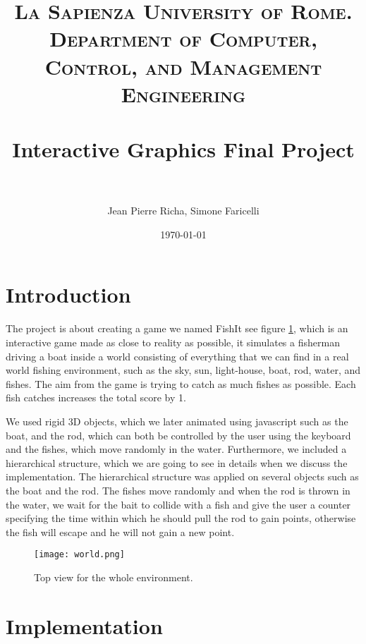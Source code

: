 \documentclass[paper=a4, fontsize=11pt]{scrartcl} %
\title{	
\normalfont \normalsize 
\textsc{La Sapienza University of Rome. Department of Computer, Control, and Management Engineering} \\ [25pt] %
\horrule{0.5pt} \\[0.4cm] %
\huge Interactive Graphics Final Project \\ %
\horrule{2pt} \\[0.5cm] %
}
\author{Jean Pierre Richa, Simone Faricelli} %
\date{\normalsize\today} %
\numberwithin{equation}{section} %
\numberwithin{figure}{section} %
\numberwithin{table}{section} %
\begin{document}
\maketitle %

\section{Introduction}

The project is about creating a game we named FishIt see figure \ref{world}, which is an interactive game made as close to reality as possible, it simulates a fisherman driving a boat inside a world consisting of everything that we can find in a real world fishing environment, such as the sky, sun, light-house, boat, rod, water, and fishes. The aim from the game is trying to catch as much fishes as possible. Each fish catches increases the total score by 1. \par We used rigid 3D objects, which we later animated using javascript such as the boat, and the rod, which can both be controlled by the user using the keyboard and the fishes, which move randomly in the water. Furthermore, we included a hierarchical structure, which we are going to see in details when we discuss the implementation. The hierarchical structure was applied on several objects such as the boat and the rod. The fishes move randomly and when the rod is thrown in the water, we wait for the bait to collide with a fish and give the user a counter specifying the time within which he should pull the rod to gain points, otherwise the fish will escape and he will not gain a new point.

\begin{figure}
\centering
\texttt{[image: world.png]}
\caption{Top view for the whole environment.}
\label{world}
\end{figure}

\newpage


\section{Implementation}
\end{document}
